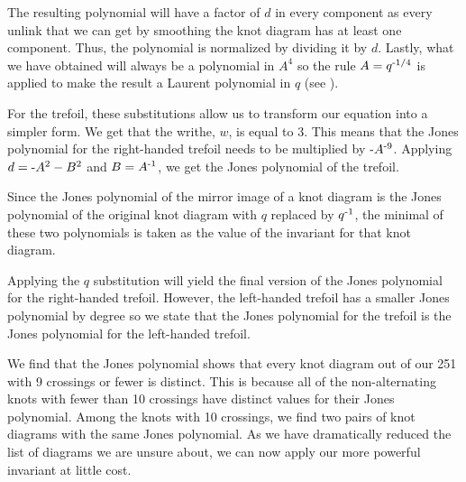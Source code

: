 \begin{paper}
The resulting polynomial will have a factor of $d$ in every component as every
unlink that we can get by smoothing the knot diagram has at least one component.
Thus, the polynomial is normalized by dividing it by $d$.
Lastly, what we have obtained will always be a polynomial in $A^4$ so the rule
$A=q^{\text-1/4}$ is applied to make the result a Laurent polynomial in $q$
(see \cite{new}).

For the trefoil, these substitutions allow us to transform our equation into a
simpler form.
We get that the writhe, $w$, is equal to 3.
This means that the Jones polynomial for the right-handed trefoil needs to be
multiplied by $\text-A^{\text-9}$.
Applying $d=\text-A^2-B^2$ and $B=A^{\text-1}$, we get the Jones polynomial of
the trefoil.


Since the Jones polynomial of the mirror image of a knot diagram is the Jones
polynomial of the original knot diagram with $q$ replaced by $q^{\text-1}$, the
minimal of these two polynomials is taken as the value of the invariant for that
knot diagram.

Applying the $q$ substitution will yield the final version of the Jones
polynomial for the right-handed trefoil.
However, the left-handed trefoil has a smaller Jones polynomial by degree so we
state that the Jones polynomial for the trefoil is the Jones polynomial for the
left-handed trefoil.




\noindent{}

We find that the Jones polynomial shows that every knot diagram out of our 251
with 9 crossings or fewer is distinct.
This is because all of the non-alternating knots with fewer than 10 crossings
have distinct values for their Jones polynomial.
Among the knots with 10 crossings, we find two pairs of knot diagrams with the
same Jones polynomial.
As we have dramatically reduced the list of diagrams we are unsure about, we can
now apply our more powerful invariant at little cost.


\end{paper}
